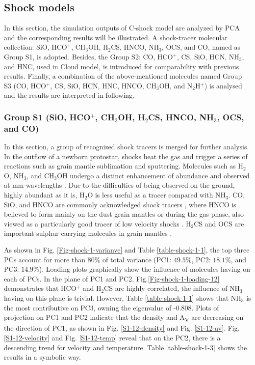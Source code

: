 \documentclass{aa}
\begin{document}
\begin{CJK*}{UTF8}{gbsn}
  
\subsection{Shock models}

     In this section, the simulation outputs of C-shock model are analyzed by PCA and the corresponding results will be illustrated. 
     A shock-tracer molecular collection: SiO, HCO$^+$, CH$_3$OH, H$_2$CS, HNCO, NH$_3$, OCS, and CO, named as Group S1, is adopted. 
     Besides, the Group S2: CO, HCO$^+$, CS, SiO, HCN, NH$_3$, and HNC, used in Cloud model, is introduced for comparability with previous results. 
     Finally, a combination of the above-mentioned molecules named Group S3 (CO, HCO$^+$, CS, SiO, HCN, HNC, HNCO, CH$_3$OH, and N$_2$H$^+$) is analysed and the results are interpreted in following.
 
 
\subsubsection{Group S1 (SiO, HCO$^+$, CH$_3$OH, H$_2$CS, HNCO, NH$_3$, OCS, and CO)}

    In this section, a group of recognized shock tracers is merged for further analysis. 
    In the outflow of a newborn protostar, shocks heat the gas and trigger a series of reactions such as grain mantle sublimation and sputtering. 
    Molecules such as H$_2$O, NH$_3$, and CH$_3$OH undergo a distinct enhancement of abundance \citep{van1998chemical} and observed at mm-wavelengths \citep{bachiller1997shock,garay1998molecular,jorgensen2007prosac}. 
    Due to the difficulties of being observed on the ground, highly abundant as it is, H$_2$O is less useful as a tracer compared with NH$_3$. 
    CO, SiO, and HNCO are commonly acknowledged shock tracers \citep{martin1997sio,rodriguez2010hnco}, where HNCO is believed to form mainly on the dust grain mantles \citep{lopez2015shedding} or during the gas phase, also viewed as a particularly good tracer of low velocity shocks \citep{kelly2017molecular}. H$_2$CS and OCS are important sulphur carrying molecules in grain mantles \citep{codella2005chemical}. 

    As shown in Fig. \ref{Fig-shock-1-varianve} and Table \ref{table-shock-1-1}, the top three PCs account for more than $80\%$ of total variance (PC1: $49.5\%$, PC2: $18.1\%$, and PC3: $14.9\%$). 
    Loading plots graphically show the influence of molecules having on each of PCs. 
    In the plane of PC1 and PC2, Fig.\ref{Fig-shock-1-loading-12} demonstrates that HCO$^+$ and H$_2$CS are highly correlated, the influence of NH$_3$ having on this plane is trivial. 
    However, Table \ref{table-shock-1-1} shows that NH$_3$ is the most contributive on PC3, owning the eigenvalue of -0.808. 
    Plots of projection on PC1 and PC2 indicate that the density and A\textsubscript{V} are decreasing on the direction of PC1, as shown in Fig. \ref{S1-12-density} and Fig. \ref{S1-12-av}. 
    Fig. \ref{S1-12-velocity} and Fig. \ref{S1-12-temp} reveal that on the PC2, there is a descending trend for velocity and temperature. 
    Table \ref{table-shock-1-3} shows the results in a symbolic way.


\end{CJK*}
\end{document}
